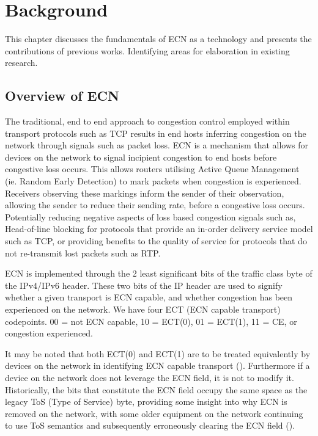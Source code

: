 \documentclass{l4proj}
\begin{document}
\chapter{Background}

This chapter discusses the fundamentals of ECN as a technology and presents the contributions of previous works. Identifying areas for elaboration in existing research.

\section{Overview of ECN}

The traditional, end to end approach to congestion control employed within transport protocols such as TCP results in end hosts inferring congestion on the network through signals such as packet loss.
ECN is a mechanism that allows for devices on the network to signal incipient congestion to end hosts before congestive loss occurs. This allows routers utilising Active Queue Management (ie. Random Early Detection) to mark packets when congestion is experienced. Receivers observing these markings inform the sender of their observation, allowing the sender to reduce their sending rate, before a congestive loss occurs. Potentially reducing negative aspects of loss based congestion signals such as, Head-of-line blocking for protocols that provide an in-order delivery service model such as TCP, or providing benefits to the quality of service for protocols that do not re-transmit lost packets such as RTP.

ECN is implemented through the 2 least significant bits of the traffic class byte of the IPv4/IPv6 header. These two bits of the IP header are used to signify whether a given transport is ECN capable, and whether congestion has been experienced on the network. We have four ECT (ECN capable transport) codepoints. 00 = not ECN capable, 10 = ECT(0), 01 = ECT(1), 11 = CE, or congestion experienced. 

It may be noted that both ECT(0) and ECT(1) are to be treated equivalently by devices on the network in identifying ECN capable transport (\cite{floyd_addition_2001}). Furthermore if a device on the network does not leverage the ECN field, it is not to modify it. Historically, the bits that constitute the ECN field occupy the same space as the legacy ToS (Type of Service) byte, providing some insight into why ECN is removed on the network, with some older equipment on the network continuing to use ToS semantics and subsequently erroneously clearing the ECN field (\cite{kuhlewind_state_2013}).
\end{document}
